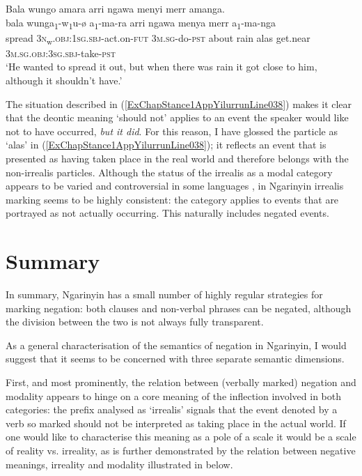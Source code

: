 \documentclass[output=paper,colorlinks,citecolor=brown]{langscibook}
\begin{document}
\begin{exe}
\ex \label{ExChapStance1AppYilurrunLine038}
    \glll Bala wungo amara arri ngawa menyi merr amanga.\\
    bala wunga\textsubscript{1}-w\textsubscript{1}u-{\o} a\textsubscript{1}-ma-ra arri ngawa menya merr a\textsubscript{1}-ma-nga\\
    spread 3\textsc{n}\textsubscript{w}.\textsc{obj:1sg.sbj}-act.on-\textsc{fut} 3\textsc{m.sg}-do-\textsc{pst} about rain alas get.near \textsc{3m.sg.obj:3sg.sbj}-take-\textsc{pst}\\
    \trans `He wanted to spread it out, but when there was rain it got close to him, although it shouldn't have.' \citep[2, \textit{retranscribed and glosses added}]{Coate1970}
\end{exe}

The situation described in (\ref{ExChapStance1AppYilurrunLine038}) makes it clear that the deontic meaning `should not' applies to an event the speaker would like not to have occurred, \textit{but it did}. For this reason, I have glossed the particle as `alas' in (\ref{ExChapStance1AppYilurrunLine038}); it reflects an event that is presented as having taken place in the real world and therefore belongs with the non-irrealis particles. Although the status of the irrealis as a modal category appears to be varied and controversial in some languages \citep{Mithun1995relativity}, in Ngarinyin irrealis marking seems to be highly consistent: the category applies to events that are portrayed as not actually occurring. This naturally includes negated events.

\section{Summary}

In summary, Ngarinyin has a small number of highly regular strategies for marking negation: both clauses and non-verbal phrases can be negated, although the division between the two is not always fully transparent.

As a general characterisation of the semantics of negation in Ngarinyin, I would suggest that it seems to be concerned with three separate semantic dimensions.

First, and most prominently, the relation between (verbally marked) negation and modality appears to hinge on a core meaning of the inflection involved in both categories: the prefix analysed as `irrealis' signals that the event denoted by a verb so marked should not be interpreted as taking place in the actual world. If one would like to characterise this meaning as a pole of a scale it would be a scale of reality vs. irreality, as is further demonstrated by the relation between negative meanings, irreality and modality illustrated in  below.
\end{document}
